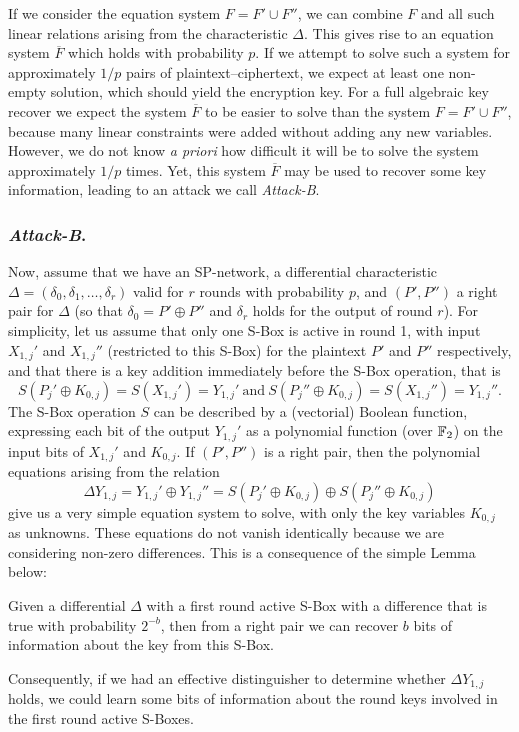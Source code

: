 If we consider the equation system $F = F' \cup F''$, we can combine $F$ and all such linear relations arising from the characteristic $\Delta$. This gives rise to an equation system $\overline{F}$ which holds with probability $p$. If we attempt to solve such a system for approximately $1/p$ pairs of plaintext--ciphertext, we expect at least one non-empty solution, which should yield the encryption key. For a full algebraic key recover we expect the system $\overline{F}$ to be easier to solve than the system $F = F' \cup F''$, because many linear constraints were added without adding any new variables. However, we do not know \emph{a priori} how difficult it will be to solve the system approximately $1/p$ times. Yet, this system $\overline{F}$ may be used to recover some key information, leading to an attack we call \emph{Attack-B}.

\subsubsection{\emph{Attack-B}.}
Now, assume that we have an SP-network, a differential characteristic $\Delta = (\delta_0, \delta_1, \ldots , \delta_r)$ valid for $r$ rounds with probability $p$, and $(P',P'')$ a right pair for $\Delta$ (so that $\delta_0 = P' \oplus P''$ and $\delta_r$ holds for the output of round $r$). For simplicity, let us assume that only one S-Box is active in round 1, with input $X_{1,j}'$ and $X_{1,j}''$ (restricted to this S-Box) for the plaintext $P'$ and $P''$ respectively, and that there is a key addition immediately before the S-Box operation, that is $$S(P_j' \oplus K_{0,j}) = S(X_{1,j}') = Y_{1,j}' \ \textrm{and} \ S(P_j'' \oplus K_{0,j}) = S(X_{1,j}'') = Y_{1,j}''.$$ The S-Box operation $S$ can be described by a (vectorial) Boolean function, expressing each bit of the output $Y_{1,j}'$ as a polynomial function (over $\mathbb{F}_2$) on the input bits of $X_{1,j}'$ and $K_{0,j}$. If $(P',P'')$ is a right pair, then the polynomial equations arising from the relation $$\Delta Y_{1,j}= Y_{1,j}' \oplus Y_{1,j}'' = S(P_j' \oplus K_{0,j}) \oplus S(P_j'' \oplus K_{0,j})$$ give us a very simple equation system to solve, with only the key variables $K_{0,j}$ as unknowns. These equations do not vanish identically because we are considering non-zero differences. This is a consequence of the simple Lemma below:
\begin{lemma}
\label{lem:sbox-prob}
Given a differential $\Delta$ with a first round active S-Box with a difference that is true with probability $2^{-b}$, then from a right pair we can recover $b$ bits of information about the key from this S-Box.
\end{lemma}
Consequently, if we had an effective distinguisher to determine whether $\Delta Y_{1,j}$ holds, we could learn some bits of information about the round keys involved in the first round active S-Boxes.

